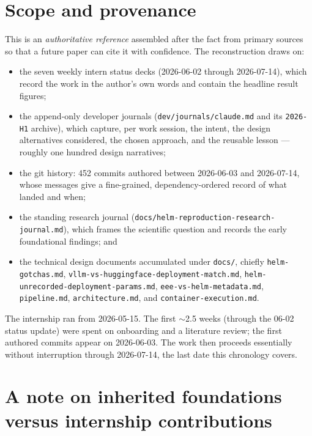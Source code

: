 \documentclass[11pt]{report}
\newcommand{\file}[1]{\texttt{#1}}
\begin{document}
\section{Scope and provenance}

This is an \emph{authoritative reference} assembled after the fact from primary
sources so that a future paper can cite it with confidence. The reconstruction
draws on:

\begin{itemize}[nosep]
  \item the seven weekly intern status decks (2026-06-02 through 2026-07-14),
        which record the work in the author's own words and contain the headline
        result figures;
  \item the append-only developer journals (\file{dev/journals/claude.md} and its
        \file{2026-H1} archive), which capture, per work session, the intent, the
        design alternatives considered, the chosen approach, and the reusable
        lesson --- roughly one hundred design narratives;
  \item the git history: 452 commits authored between 2026-06-03 and 2026-07-14,
        whose messages give a fine-grained, dependency-ordered record of what
        landed and when;
  \item the standing research journal
        (\file{docs/helm-reproduction-research-journal.md}), which frames the
        scientific question and records the early foundational findings; and
  \item the technical design documents accumulated under \file{docs/}, chiefly
        \file{helm-gotchas.md}, \file{vllm-vs-huggingface-deployment-match.md},
        \file{helm-unrecorded-deployment-params.md}, \file{eee-vs-helm-metadata.md},
        \file{pipeline.md}, \file{architecture.md}, and
        \file{container-execution.md}.
\end{itemize}

The internship ran from 2026-05-15. The first $\sim$2.5 weeks (through the 06-02
status update) were spent on onboarding and a literature review; the first
authored commits appear on 2026-06-03. The work then proceeds essentially without
interruption through 2026-07-14, the last date this chronology covers.

\section{A note on inherited foundations versus internship contributions}
\end{document}
